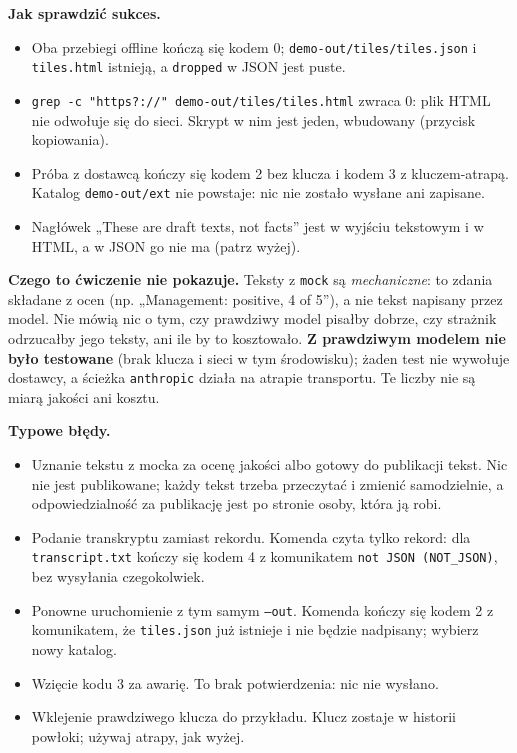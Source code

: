 {\textbf{Jak sprawdzić sukces.}
\begin{itemize}[leftmargin=*,itemsep=1pt]
  \item Oba przebiegi offline kończą się kodem 0; \texttt{demo-out/tiles/tiles.json} i
        \texttt{tiles.html} istnieją, a \texttt{dropped} w JSON jest puste.
  \item \texttt{grep -c "https?://" demo-out/tiles/tiles.html} zwraca 0: plik HTML nie
        odwołuje się do sieci. Skrypt w nim jest jeden, wbudowany (przycisk kopiowania).
  \item Próba z dostawcą kończy się kodem 2 bez klucza i kodem 3 z kluczem-atrapą. Katalog
        \texttt{demo-out/ext} nie powstaje: nic nie zostało wysłane ani zapisane.
  \item Nagłówek „These are draft texts, not facts” jest w wyjściu tekstowym i w HTML,
        a w JSON go nie ma (patrz wyżej).
\end{itemize}

\textbf{Czego to ćwiczenie nie pokazuje.} Teksty z \texttt{mock} są \emph{mechaniczne}:
to zdania składane z ocen (np. „Management: positive, 4 of 5”), a nie tekst napisany
przez model. Nie mówią nic o tym, czy prawdziwy model pisałby dobrze, czy strażnik
odrzucałby jego teksty, ani ile by to kosztowało. \textbf{Z prawdziwym modelem nie
było testowane} (brak klucza i sieci w tym środowisku); żaden test nie wywołuje
dostawcy, a ścieżka \texttt{anthropic} działa na atrapie transportu. Te liczby nie są
miarą jakości ani kosztu.

\textbf{Typowe błędy.}
\begin{itemize}[leftmargin=*,itemsep=1pt]
  \item Uznanie tekstu z mocka za ocenę jakości albo gotowy do publikacji tekst.
        Nic nie jest publikowane; każdy tekst trzeba przeczytać i zmienić samodzielnie,
        a odpowiedzialność za publikację jest po stronie osoby, która ją robi.
  \item Podanie transkryptu zamiast rekordu. Komenda czyta tylko rekord: dla
        \texttt{transcript.txt} kończy się kodem 4 z komunikatem \texttt{not JSON (NOT\_JSON)},
        bez wysyłania czegokolwiek.
  \item Ponowne uruchomienie z tym samym \texttt{--out}. Komenda kończy się kodem 2 z
        komunikatem, że \texttt{tiles.json} już istnieje i nie będzie nadpisany; wybierz
        nowy katalog.
  \item Wzięcie kodu 3 za awarię. To brak potwierdzenia: nic nie wysłano.
  \item Wklejenie prawdziwego klucza do przykładu. Klucz zostaje w historii powłoki;
        używaj atrapy, jak wyżej.
\end{itemize}

}

